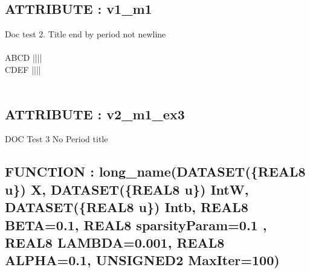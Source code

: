 \subsection*{ATTRIBUTE : v1\_m1}
\hypertarget{ecldoc:example_3_example_3.mod_1.v1_m1}{}
Doc test 2. Title end by period not newline  \\
 \\
 ABCD |||| \\
 CDEF |||| \\
 \\
\subsection*{ATTRIBUTE : v2\_m1\_ex3}
\hypertarget{ecldoc:example_3_example_3.mod_1.v2_m1_ex3}{}
DOC Test 3 No Period title \\
\subsection*{FUNCTION : long\_name(DATASET(\{REAL8 u\}) X, DATASET(\{REAL8 u\}) IntW, DATASET(\{REAL8 u\}) Intb, REAL8 BETA=0.1, REAL8 sparsityParam=0.1 , REAL8 LAMBDA=0.001, REAL8 ALPHA=0.1, UNSIGNED2 MaxIter=100)}
\hypertarget{ecldoc:example_3_example_3.mod_1.long_name}{}



